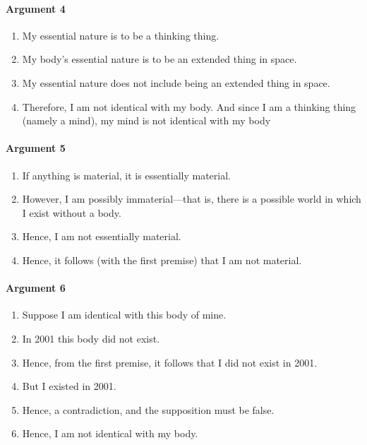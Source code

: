 \documentclass[]{article}
\begin{document}
\paragraph{Argument 4}\label{argument-4}

\begin{enumerate}
\def\labelenumi{\arabic{enumi}.}
\itemsep1pt\parskip0pt
\item
  My essential nature is to be a thinking thing.
\item
  My body's essential nature is to be an extended thing in space.
\item
  My essential nature does not include being an extended thing in space.
\item
  Therefore, I am not identical with my body. And since I am a thinking
  thing (namely a mind), my mind is not identical with my body
\end{enumerate}

\paragraph{Argument 5}\label{argument-5}

\begin{enumerate}
\def\labelenumi{\arabic{enumi}.}
\itemsep1pt\parskip0pt
\item
  If anything is material, it is essentially material.
\item
  However, I am possibly immaterial---that is, there is a possible world
  in which I exist without a body.
\item
  Hence, I am not essentially material.
\item
  Hence, it follows (with the first premise) that I am not material.
\end{enumerate}

\paragraph{Argument 6}\label{argument-6}

\begin{enumerate}
\def\labelenumi{\arabic{enumi}.}
\itemsep1pt\parskip0pt
\item
  Suppose I am identical with this body of mine.
\item
  In 2001 this body did not exist.
\item
  Hence, from the first premise, it follows that I did not exist in
  2001.
\item
  But I existed in 2001.
\item
  Hence, a contradiction, and the supposition must be false.
\item
  Hence, I am not identical with my body.
\end{enumerate}
\end{document}

